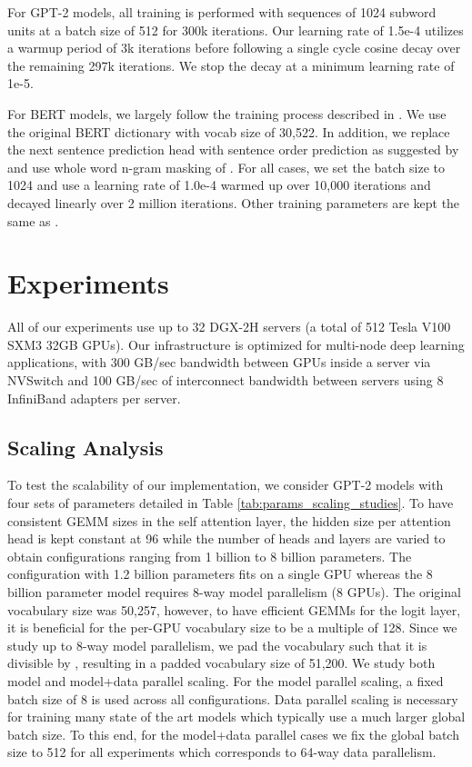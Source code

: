 \documentclass{article}
\begin{document}
For GPT-2 models, all training is performed with sequences of 1024 subword units at a batch size of 512 for 300k iterations. Our learning rate of 1.5e-4 utilizes a warmup period of 3k iterations before following a single cycle cosine decay over the remaining 297k iterations. We stop the decay at a minimum learning rate of 1e-5.

For BERT models, we largely follow the training process described in \cite{ALBERT2019}. We use the original BERT dictionary with vocab size of 30,522. In addition, we replace the next sentence prediction head with sentence order prediction as suggested by \cite{ALBERT2019} and use whole word n-gram masking of \cite{SpanBERT2019}. For all cases, we set the batch size to 1024 and use a learning rate of 1.0e-4 warmed up over 10,000 iterations and decayed linearly over 2 million iterations. Other training parameters are kept the same as \cite{devlin2018bert}.



 \section{Experiments}

All of our experiments use up to 32 DGX-2H servers (a total of 512 Tesla V100 SXM3 32GB GPUs). Our infrastructure is optimized for multi-node deep learning applications, with 300 GB/sec bandwidth between GPUs inside a server via NVSwitch and 100 GB/sec of interconnect bandwidth between servers using 8 InfiniBand adapters per server.

\subsection{Scaling Analysis}
To test the scalability of our implementation, we consider GPT-2 models with four sets of parameters detailed in Table \ref{tab:params_scaling_studies}. To have consistent GEMM sizes in the self attention layer, the hidden size per attention head is kept constant at 96 while the number of heads and layers are varied to obtain configurations ranging from 1 billion to 8 billion parameters. The configuration with 1.2 billion parameters fits on a single GPU whereas the 8 billion parameter model requires 8-way model parallelism (8 GPUs). The original vocabulary size was 50,257, however, to have efficient GEMMs for the logit layer, it is beneficial for the per-GPU vocabulary size to be a multiple of 128. Since we study up to 8-way model parallelism, we pad the vocabulary such that it is divisible by , resulting in a padded vocabulary size of 51,200.  We study both model and model+data parallel scaling. For the model parallel scaling, a fixed batch size of 8 is used across all configurations. Data parallel scaling is necessary for training many state of the art models which typically use a much larger global batch size. To this end, for the model+data parallel cases we fix the global batch size to 512 for all experiments which corresponds to 64-way data parallelism. 
\end{document}
